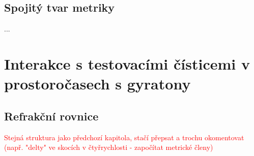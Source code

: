 \subsection{Spojitý tvar metriky}
...
\section{Interakce s testovacími čísticemi v prostoročasech s gyratony}
\subsection{Refrakční rovnice}
\textcolor{red}{Stejná struktura jako předchozí kapitola, stačí přepsat a trochu okomentovat
(např. "delty" ve skocích v čtyřrychlosti - započítat metrické členy)}